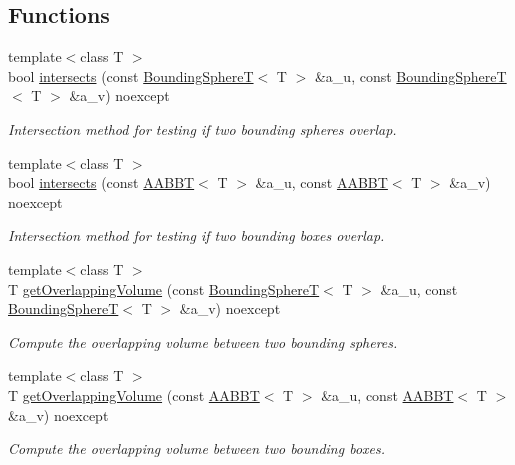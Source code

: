 \subsection*{Functions}
\begin{DoxyCompactItemize}
\item 
{\footnotesize template$<$class T $>$ }\\bool \hyperlink{namespaceBoundingVolumes_af35f33c5f319a466550d9ad1040beced}{intersects} (const \hyperlink{classBoundingVolumes_1_1BoundingSphereT}{Bounding\+SphereT}$<$ T $>$ \&a\+\_\+u, const \hyperlink{classBoundingVolumes_1_1BoundingSphereT}{Bounding\+SphereT}$<$ T $>$ \&a\+\_\+v) noexcept
\begin{DoxyCompactList}\small\item\em Intersection method for testing if two bounding spheres overlap. \end{DoxyCompactList}\item 
{\footnotesize template$<$class T $>$ }\\bool \hyperlink{namespaceBoundingVolumes_a5c360ccd42017c01acbe1caf2cfd1efe}{intersects} (const \hyperlink{classBoundingVolumes_1_1AABBT}{A\+A\+B\+BT}$<$ T $>$ \&a\+\_\+u, const \hyperlink{classBoundingVolumes_1_1AABBT}{A\+A\+B\+BT}$<$ T $>$ \&a\+\_\+v) noexcept
\begin{DoxyCompactList}\small\item\em Intersection method for testing if two bounding boxes overlap. \end{DoxyCompactList}\item 
{\footnotesize template$<$class T $>$ }\\T \hyperlink{namespaceBoundingVolumes_a4f159289c317e02beedb4b38136ad692}{get\+Overlapping\+Volume} (const \hyperlink{classBoundingVolumes_1_1BoundingSphereT}{Bounding\+SphereT}$<$ T $>$ \&a\+\_\+u, const \hyperlink{classBoundingVolumes_1_1BoundingSphereT}{Bounding\+SphereT}$<$ T $>$ \&a\+\_\+v) noexcept
\begin{DoxyCompactList}\small\item\em Compute the overlapping volume between two bounding spheres. \end{DoxyCompactList}\item 
{\footnotesize template$<$class T $>$ }\\T \hyperlink{namespaceBoundingVolumes_ae5716e39e88aaeec0c204f453cac2acd}{get\+Overlapping\+Volume} (const \hyperlink{classBoundingVolumes_1_1AABBT}{A\+A\+B\+BT}$<$ T $>$ \&a\+\_\+u, const \hyperlink{classBoundingVolumes_1_1AABBT}{A\+A\+B\+BT}$<$ T $>$ \&a\+\_\+v) noexcept
\begin{DoxyCompactList}\small\item\em Compute the overlapping volume between two bounding boxes. \end{DoxyCompactList}\end{DoxyCompactItemize}


